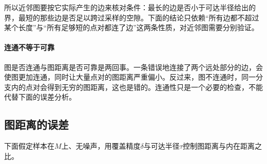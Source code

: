 所以近邻图要按它实际产生的边来核对条件：最长的边是否小于可达半径给出的界，最短的那些边是否足以跨过采样的空隙。下面的结论只依赖“所有边都不超过某个长度”与“所有足够短的点对都连了边”这两条性质，对近邻图需要分别验证。

\paragraph{连通不等于可靠}

图是否连通与图距离是否可靠是两回事。一条错误地连接了两个远处部分的边，会使图更加连通，同时让大量点对的图距离严重偏小。反过来，图不连通时，同一分支内的点对会得到无穷的图距离，这也是错的。连通性只是一个必要的检查，不能代替下面的误差分析。

\subsection{图距离的误差}
\label{sec:mrec-graph-distance-error}

下面假定样本在$M$上、无噪声，用覆盖精度$\delta$与可达半径$\tau$控制图距离与内在距离之比。


